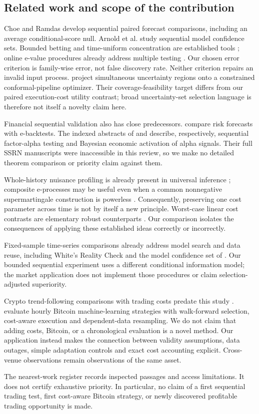 \subsection{Related work and scope of the contribution}

Choe and Ramdas \citep{choe2024} develop sequential paired forecast comparisons,
including an average conditional-score null. Arnold et al.
\citep{arnold2026} study sequential model confidence sets. Bounded betting and
time-uniform concentration are established tools
\citep{waudby2024,howard2021}; online e-value procedures already address multiple
testing \citep{xu2024,tian2021}. Our chosen error criterion is family-wise error,
not false discovery rate. Neither criterion repairs an invalid input process.
\citet{li2026} project simultaneous uncertainty regions onto a constrained
conformal-pipeline optimizer. Their coverage-feasibility target differs from
our paired execution-cost utility contrast; broad uncertainty-set selection
language is therefore not itself a novelty claim here.

Financial sequential validation also has close predecessors.
\citet{jiao2026} compare risk forecasts with e-backtests. The indexed abstracts
of \citet{liu2026} and \citet{stephan2026} describe, respectively, sequential
factor-alpha testing and Bayesian economic activation of alpha signals. Their
full SSRN manuscripts were inaccessible in this review, so we make no detailed
theorem comparison or priority claim against them.

Whole-history nuisance profiling is already present in universal inference
\citep{wasserman2020}; composite e-processes may be useful even when a common
nonnegative supermartingale construction is powerless
\citep{ramdas2022}. Consequently, preserving one cost parameter across time is
not by itself a new principle. Worst-case linear cost contrasts are elementary
robust counterparts \citep{bental1998}. Our comparison isolates the consequences
of applying these established ideas correctly or incorrectly.

Fixed-sample time-series comparisons already address model search and data reuse,
including White's Reality Check \citep{white2000} and the model confidence set
of \citet{hansen2011}. Our bounded sequential experiment uses a different
conditional information model; the market application does not implement
those procedures or claim selection-adjusted superiority.

Crypto trend-following comparisons with trading costs predate this study
\citep{le2023}. \citet{bysik2026} evaluate hourly Bitcoin machine-learning
strategies with walk-forward selection, cost-aware execution and dependent-data
resampling. We do not claim that adding costs, Bitcoin, or a chronological
evaluation is a novel method. Our application instead makes the connection
between validity assumptions, data outages, simple adaptation controls and
exact cost accounting explicit. Cross-venue observations remain observations
of the same asset.

The nearest-work register records inspected passages and access limitations.
It does not certify exhaustive priority. In particular, no claim of a first
sequential trading test, first cost-aware Bitcoin strategy, or newly discovered
profitable trading opportunity is made.
